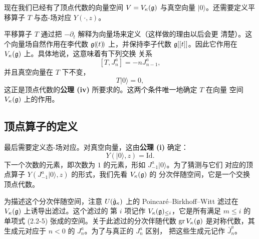 现在我们已经有了顶点代数的向量空间 $V=V_\kappa(\mathfrak{g})$ 与真空向量
$|0\rangle$。还需要定义平移算子 $T$ 与态-场对应 $Y(\cdot,z)$。

平移算子 $T$ 通过把 $-\partial_t$ 解释为向量场来定义（这样做的理由以后会更
清楚）。这个向量场自然作用在李代数 $\mathfrak{g}(\!(t)\!)$ 上，并保持李子代数
$\mathfrak{g}[[t]]$。因此它作用在 $V_\kappa(\mathfrak{g})$ 上。具体地说，这意味着有下列交换
关系
\[
    [T,J^a_n]=-nJ^a_{n-1},
\]
并且真空向量在 $T$ 下不变，
\[
    T|0\rangle=0,
\]
这正是顶点代数的\textbf{公理 (iv)} 所要求的。这两个条件唯一地确定 $T$ 在向量
空间 $V_\kappa(\mathfrak{g})$ 上的作用。

\subsection{顶点算子的定义}

最后需要定义态-场对应。对真空向量，这由\textbf{公理 (i)} 确定：
\[
    Y(|0\rangle,z)=\mathrm{Id}.
\]
下一个次数的元素，即次数为 $1$ 的元素，形如 $J^a_{-1}|0\rangle$。为了猜测与它们
对应的顶点算子 $Y(J^a_{-1}|0\rangle,z)$ 的形式，我们先看 $V_\kappa(\mathfrak{g})$ 的
分次伴随空间，它是一个交换顶点代数。

为描述这个分次伴随空间，注意 $U(\hat{\mathfrak{g}}_\kappa)$ 上的
Poincar\'e--Birkhoff--Witt 滤过在 $V_\kappa(\mathfrak{g})$ 上诱导出滤过。这个滤过的
第 $i$ 项记作 $V_\kappa(\mathfrak{g})_{\le i}$，它是所有满足 $m\le i$ 的单项式
(2.2-5) 张成的空间。关于此滤过的分次伴随代数 $\operatorname{gr}V_\kappa(\mathfrak{g})$
是对称代数，其生成元对应于 $n<0$ 的 $J^a_n$。为了与真正的 $J^a_n$ 区别，
把这些生成元记作 $\bar J^a_n$。


